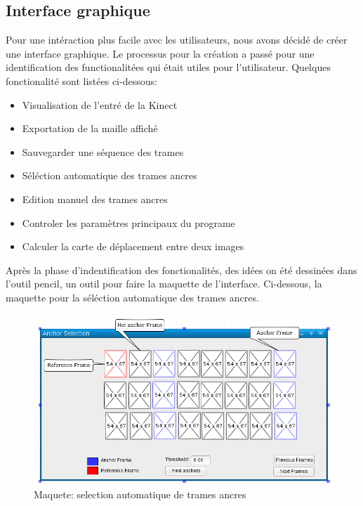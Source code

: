 \documentclass[a4paper,12pt]{article}
\begin{document}
\subsection*{Interface graphique}

Pour une intéraction plus facile avec les utilisateurs, nous avons
décidé de créer une interface graphique. Le processus pour la création
a passé pour une identification des functionalitées qui était utiles
pour l'utilisateur. Quelques fonctionalité sont listées ci-dessous:

\begin{itemize}
\item Visualisation de l'entré de la Kinect 
\item Exportation de la maille affiché
\item Sauvegarder une séquence des trames
\item Séléction automatique des trames ancres
\item Edition manuel des trames ancres
\item Controler les paramètres principaux du programe
\item Calculer la carte de déplacement entre deux images
\end{itemize}

Après la phase d'indentification des fonctionalités, des idées on été
dessinées dans l'outil pencil\cite{Pencil}, un outil pour faire la
maquette de l'interface. 
Ci-dessous, la maquette pour la séléction automatique des trames ancres.

\begin{figure}[h!]
  \begin{center}
    \includegraphics[scale=0.4]{img/pencil.png}
    \caption{Maquete: selection automatique de trames ancres}
  \end{center}
\end{figure}
\end{document}
